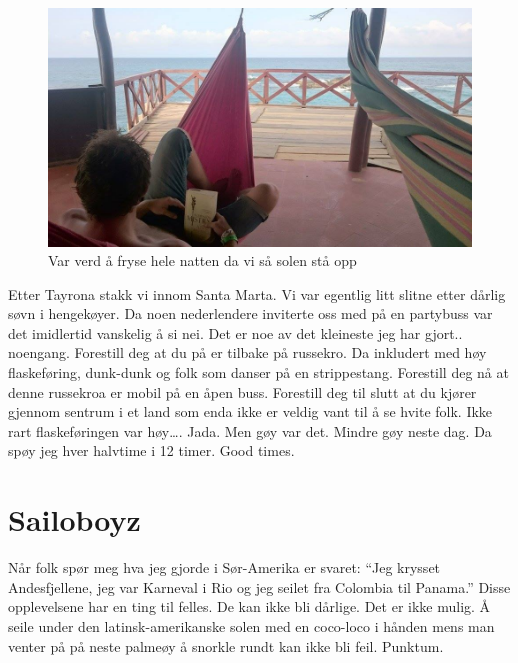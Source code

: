 \begin{figure}[H]
	\centering
	\includegraphics[width=\textwidth]{soveikoye}
	\caption*{Var verd å fryse hele natten da vi så solen stå opp}
	\label{fig:sovekolasj}
\end{figure}

Etter Tayrona stakk vi innom Santa Marta. Vi var egentlig litt slitne
etter dårlig søvn i hengekøyer. Da noen nederlendere inviterte oss med
på en partybuss var det imidlertid vanskelig å si nei. Det er
noe av det kleineste jeg har gjort.. noengang. Forestill deg at du på
er tilbake på russekro. Da inkludert med høy flaskeføring, dunk-dunk
og folk som danser på en strippestang. Forestill deg nå at denne russekroa er
mobil på en åpen buss. Forestill deg til slutt at du kjører gjennom
sentrum i et land som enda ikke er veldig vant til å se hvite folk. 
Ikke rart flaskeføringen var
høy\ldots. Jada. Men gøy var det. Mindre gøy neste dag. Da spøy jeg
hver halvtime i 12 timer. Good times. 

\section*{Sailoboyz}

Når folk spør meg hva jeg gjorde i Sør-Amerika er svaret: ``Jeg
krysset Andesfjellene, jeg var  Karneval i Rio og jeg seilet fra Colombia
til Panama.'' Disse opplevelsene har en ting til felles. De kan ikke
bli dårlige. Det er ikke mulig. Å seile under den
latinsk-amerikanske solen med en coco-loco i hånden mens man venter på
på neste palmeøy å snorkle rundt kan ikke bli feil. Punktum.

